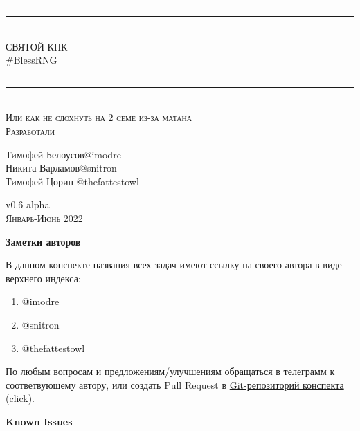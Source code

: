 \documentclass{article}
\begin{document}
\begin{titlepage}
    \centering
    \vspace*{\baselineskip}
    \rule{\textwidth}{1.6pt}\vspace*{-\baselineskip}\vspace*{2pt}
    \rule{\textwidth}{0.4pt}\\[\baselineskip]
    {\LARGE СВЯТОЙ КПК\\ [0.3\baselineskip] \#BlessRNG}\\[0.2\baselineskip]
    \rule{\textwidth}{0.4pt}\vspace*{-\baselineskip}\vspace{3.2pt}
    \rule{\textwidth}{1.6pt}\\[\baselineskip]
    \scshape
    Или как не сдохнуть на 2 семе из-за матана \\
    \vspace*{2\baselineskip}
    Разработали \\[\baselineskip]
    {\Large Тимофей Белоусов\quad @imodre \\ Никита Варламов\quad @snitron\\ Тимофей Цорин \quad @thefattestowl\par}
    \vfill
    v0.6 alpha\\
    {\scshape Январь-Июнь 2022} \par
\end{titlepage}

\textbf{Заметки авторов}

В данном конспекте названия всех задач имеют ссылку на своего автора в виде верхнего индекса:
\begin{enumerate}
    \item @imodre
    \item @snitron
    \item @thefattestowl
\end{enumerate}
По любым вопросам и предложениям/улучшениям обращаться в телеграмм к соответвующему автору, или создать Pull Request в \href{https://github.com/snitron/ct-itmo}{Git-репозиторий конспекта (click)}.


\textbf{Known Issues}
\end{document}
